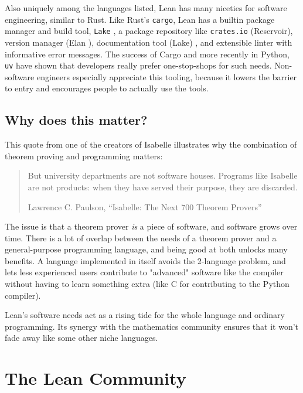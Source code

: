 \documentclass{article}
\begin{document}
Also uniquely among the languages listed, Lean has many niceties for software engineering, similar to Rust. Like Rust's \texttt{cargo}, Lean has a builtin package manager and build tool, \texttt{Lake} , a package repository like \texttt{crates.io}\cite{crates.io} (Reservoir), version manager (Elan \cite{elan}), documentation tool (Lake) , and extensible linter with informative error messages. The success of Cargo and more recently in Python, \texttt{uv} \cite{uv} have shown that developers really prefer one-stop-shops for such needs. Non-software engineers especially appreciate this tooling, because it lowers the barrier to entry and encourages people to actually use the tools.

\subsection{Why does this matter?}


This quote from one of the creators of Isabelle illustrates why the combination of theorem proving and programming matters:

\begin{quote}
  But university departments are not software houses. Programs like Isabelle are not products: when they have served
  their purpose, they are discarded. 

  Lawrence C. Paulson, ``Isabelle: The Next 700 Theorem Provers''

\end{quote}

The issue is that a theorem prover \textit{is} a piece of software, and software grows over time. There is a lot of overlap between the needs of a theorem prover and a general-purpose programming language, and being good at both unlocks many benefits. A language implemented in itself avoids the 2-language problem, and lets less experienced users contribute to "advanced" software like the compiler without having to learn something extra (like C for contributing to the Python compiler).

Lean's software needs act as a rising tide for the whole language and ordinary programming. Its synergy with the mathematics community ensures that it won't fade away like some other niche languages.

\section{The Lean Community}
\end{document}
